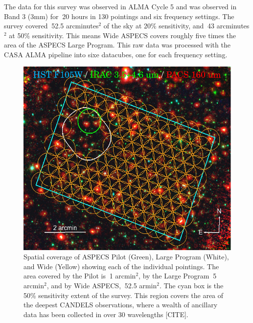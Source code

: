 The data for this survey was observed in ALMA Cycle 5 and was observed in Band 3 (3mm) for $~$20 hours in 130 pointings and six frequency settings. The survey covered $~$52.5 arcminutes$^2$ of the sky at 20\% sensitivity, and $~$43 arcminutes$^2$ at 50\% sensitivity. This means Wide ASPECS covers roughly five times the area of the ASPECS Large Program. This raw data was processed with the CASA ALMA pipeline into sixe datacubes, one for each frequency setting.

\begin{figure}[tbp]
\centering \includegraphics[width=120mm]{Wide_ASPECS_Coverage.png}
\caption{Spatial coverage of ASPECS Pilot (Green), Large Program (White), and Wide (Yellow) showing each of the individual pointings. The area covered by the Pilot is $~$1 arcmin$^2$, by the Large Program $~$5 arcmin$^2$, and by Wide ASPECS, $~$52.5 armin$^2$. The cyan box is the 50\% sensitivity extent of the survey. This region covers the area of the deepest CANDELS observations, where a wealth of ancillary data has been collected in over 30 wavelengths [CITE].}
\label{fig:ASPECS_Coverage}
\end{figure}

